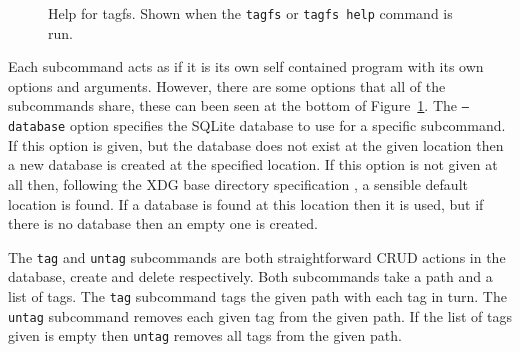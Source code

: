 \begin{figure}[h]
    \centering
    \caption[Help for \texttt{tagfs} CLI]{Help for tagfs. Shown when the
        \texttt{tagfs} or \texttt{tagfs help} command is run. }
    \label{fig:root-cli}
\end{figure}

Each subcommand acts as if it is its own self contained program with its own
options and arguments. However, there are some options that all of the
subcommands share, these can been seen at the bottom of
Figure~\ref{fig:root-cli}. The \texttt{--database} option specifies the SQLite
database to use for a specific subcommand. If this option is given, but the
database does not exist at the given location then a new database is created at
the specified location. If this option is not given at all then, following the
XDG base directory specification \cite{xdg-base-dir-spec}, a sensible default
location is found. If a database is found at this location then it is used, but
if there is no database then an empty one is created.

The \texttt{tag} and \texttt{untag} subcommands are both straightforward CRUD
actions in the database, create and delete respectively. Both subcommands take
a path and a list of tags. The \texttt{tag} subcommand tags the given path with
each tag in turn. The \texttt{untag} subcommand removes each given tag from the
given path. If the list of tags given is empty then \texttt{untag} removes all
tags from the given path.

